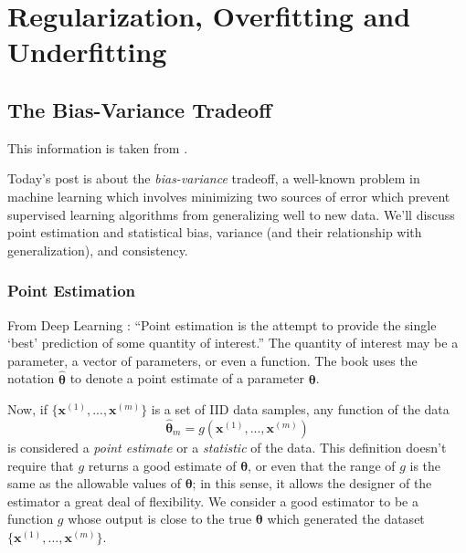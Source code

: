 
\chapter{Regularization, Overfitting and Underfitting}
\label{sec:Regularization}

\section{The Bias-Variance Tradeoff}

This information is taken from \cite{DanielSaunders2017}.

Today's post is about the \textit{bias-variance} tradeoff, a well-known problem in machine learning which involves minimizing two sources of error which prevent supervised learning algorithms from generalizing well to new data. We'll discuss point estimation and statistical bias, variance (and their relationship with generalization), and consistency.

\subsection{Point Estimation}

From Deep Learning \cite{Goodfellow2016}: ``Point estimation is the attempt to provide the single `best' prediction of some quantity of interest.'' The quantity of interest may be a parameter, a vector of parameters, or even a function. The book uses the notation $\boldsymbol{\hat{\theta}}$ to denote a point estimate of a parameter $\boldsymbol{\theta}$.



Now, if $\{ \boldsymbol{x}^{(1)}, ..., \boldsymbol{x}^{(m)}\}$ is a set of \ac{IID} data samples, any function of the data
\begin{equation}
\boldsymbol{\hat\theta}_m = g(\boldsymbol{x}^{(1)}, ..., \boldsymbol{x}^{(m)})
\end{equation}
is considered a \textit{point estimate} or a \textit{statistic} of the data. This definition doesn't require that $g$ returns a good estimate of $\boldsymbol{\theta}$, or even that the range of $g$ is the same as the allowable values of $\boldsymbol{\theta}$; in this sense, it allows the designer of the estimator a great deal of flexibility. We consider a good estimator to be a function $g$ whose output is close to the true $\boldsymbol{\theta}$ which generated the dataset $\{ \boldsymbol{x}^{(1)}, ..., \boldsymbol{x}^{(m)} \}$.

